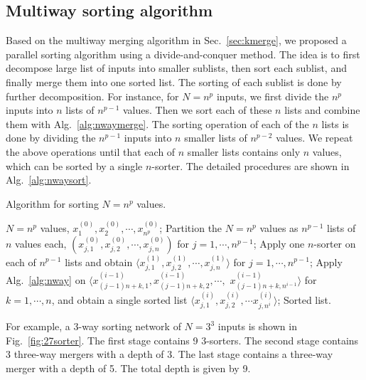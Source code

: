 \documentclass[10pt,journal,cspaper,compsoc]{IEEEtran}
\begin{document}
\subsection{Multiway sorting algorithm}
Based on the multiway merging algorithm in Sec.~\ref{sec:kmerge}, we proposed a parallel sorting algorithm using a divide-and-conquer method. The idea is to first decompose large list of inputs into smaller sublists, then sort each sublist, and finally merge them into one sorted list. The sorting of each sublist is done by further decomposition.
For instance, for $N=n^p$ inputs, we first divide the $n^p$ inputs into $n$ lists of $n^{p-1}$ values. Then we sort each of these $n$ lists and combine them with Alg.~\ref{alg:nwaymerge}. The sorting operation of each of the $n$ lists is done by dividing the $n^{p-1}$ inputs into $n$ smaller lists of $n^{p-2}$ values. We repeat the above operations until that each of $n$ smaller lists contains only $n$ values, which can be sorted by a single $n$-sorter.
The detailed procedures are shown in Alg.~\ref{alg:nwaysort}.

\begin{algorithm}[!h]
  \caption{Algorithm for sorting $N=n^{p}$ values.}
  \begin{algorithmic}
    \REQUIRE $N=n^{p}$ values, $x^{(0)}_{1}, x^{(0)}_{2}, \cdots, x^{(0)}_{n^p}$;
\STATE Partition the $N=n^p$ values as $n^{p-1}$ lists of $n$ values each, $(x^{(0)}_{j,1}, x^{(0)}_{j,2}, \cdots, x^{(0)}_{j,n})$ for $j=1,\cdots,n^{p-1}$;
    \STATE Apply one $n$-sorter on each of $n^{p-1}$ lists and obtain $\langle x^{(1)}_{j,1}, x^{(1)}_{j,2}, \cdots, x^{(1)}_{j,n} \rangle$ for $j=1,\cdots,n^{p-1}$;
            \STATE Apply Alg.~\ref{alg:nway} on $\langle x^{(i-1)}_{(j-1)n+k,1}, x^{(i-1)}_{(j-1)n+k,2}, \cdots,$ $x^{(i-1)}_{(j-1)n+k,n^{i-1}} \rangle$ for $k=1,\cdots,n$, and obtain a single sorted list $\langle x^{(i)}_{j,1}, x^{(i)}_{j,2}, \cdots x^{(i)}_{j,n^i} \rangle$;
        \ENDFOR
    \ENDFOR
    \RETURN Sorted list.
  \end{algorithmic}
  \label{alg:nwaysort}
\end{algorithm}



For example, a 3-way sorting network of $N=3^3$ inputs is shown in Fig.~\ref{fig:27sorter}. The first stage contains 9 3-sorters. The second stage contains 3 three-way mergers with a depth of 3. The last stage contains a three-way merger with a depth of 5. The total depth is given by 9.
\end{document}
